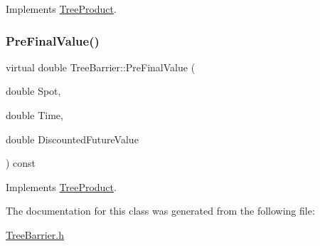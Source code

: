 Implements \hyperlink{classTreeProduct_acda7abc61cf6ac1b0f69a09eb0709832}{Tree\+Product}.

\hypertarget{classTreeBarrier_a507840c03551ece81bae4a97d342a368}{}\label{classTreeBarrier_a507840c03551ece81bae4a97d342a368} 
\subsubsection{\texorpdfstring{Pre\+Final\+Value()}{PreFinalValue()}}
{\footnotesize\ttfamily virtual double Tree\+Barrier\+::\+Pre\+Final\+Value (\begin{DoxyParamCaption}\item[{double}]{Spot,  }\item[{double}]{Time,  }\item[{double}]{Discounted\+Future\+Value }\end{DoxyParamCaption}) const\hspace{0.3cm}{\ttfamily [virtual]}}



Implements \hyperlink{classTreeProduct_a0b58b8acdd3759f55212c1c65361056e}{Tree\+Product}.



The documentation for this class was generated from the following file\+:\begin{DoxyCompactItemize}
\item 
\hyperlink{TreeBarrier_8h}{Tree\+Barrier.\+h}\end{DoxyCompactItemize}
